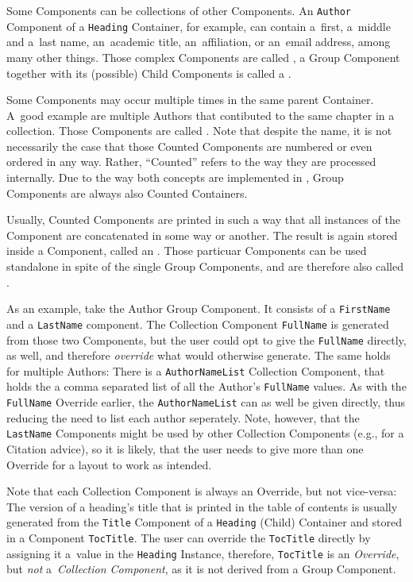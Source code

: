 Some Components can be collections of other Components. An
\texttt{Author} Component of a \texttt{Heading} Container, for
example, can contain a~first, a~middle and a~last name, an~academic
title, an~affiliation, or an~email address, among many other
things. Those complex Components are called , a Group Component together with its (possible) Child
Components is called a .

Some Components may occur multiple times in the same parent
Container. A~good example are multiple Authors that contibuted to the
same chapter in a collection. Those Components are called
. Note that despite
the name, it is not necessarily the case that those Counted Components
are numbered or even ordered in any way. Rather, “Counted” refers to
the way they are processed internally. Due to the way both concepts
are implemented in {\CoCoTeX}, Group Components are always also
Counted Containers.

Usually, Counted Components are printed in such a way that all
instances of the Component are concatenated in some way or
another. The result is again stored inside a Component, called an
. Those particuar Components can be
used standalone in spite of the single Group Components, and are
therefore also called .

As an example, take the Author Group Component. It consists of a
\texttt{FirstName} and a \texttt{LastName} component. The Collection
Component \texttt{FullName} is generated from those two Components,
but the user could opt to give the \texttt{FullName} directly, as
well, and therefore \textit{override} what {\CoCoTeX} would otherwise
generate. The same holds for multiple Authors: There is a
\texttt{AuthorNameList} Collection Component, that holds the a comma
separated list of all the Author's \texttt{FullName} values. As with
the \texttt{FullName} Override earlier, the \texttt{AuthorNameList}
can as well be given directly, thus reducing the need to list each
author seperately.  Note, however, that the \texttt{LastName}
Components might be used by other Collection Components (e.g., for a
Citation advice), so it is likely, that the user needs to give more
than one Override for a layout to work as intended.

Note that each Collection Component is always an Override, but not
vice-versa: The version of a heading's title that is printed in the
table of contents is usually generated from the \texttt{Title}
Component of a \texttt{Heading} (Child) Container and stored in a
Component \texttt{TocTitle}. The user can override the
\texttt{TocTitle} directly by assigning it a~value in the
\texttt{Heading} Instance, therefore, \texttt{TocTitle} is an
\textit{Override}, but \textit{not} a~\textit{Collection Component},
as it is not derived from a Group Component.



